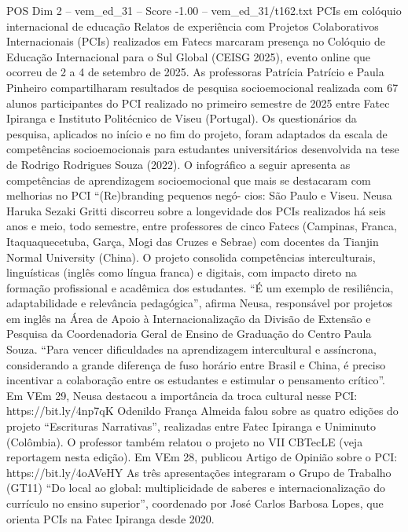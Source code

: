 \begin{textsample}{POS Dim 2 – vem\_ed\_31 – Score -1.00 – vem\_ed\_31/t162.txt}  \label{ex:f2_pos_064}
PCIs em colóquio internacional de educação Relatos de experiência com Projetos Colaborativos Internacionais (PCIs) realizados em Fatecs marcaram presença no Colóquio de Educação Internacional para o Sul Global (CEISG 2025), evento online que ocorreu de 2 a 4 de setembro de 2025.
As professoras Patrícia Patrício e Paula Pinheiro compartilharam resultados de pesquisa socioemocional realizada com 67 alunos participantes do PCI realizado no primeiro semestre de 2025 entre Fatec Ipiranga e Instituto Politécnico de Viseu (Portugal).
Os questionários da pesquisa, aplicados no início e no fim do projeto, foram adaptados da escala de competências socioemocionais para estudantes universitários desenvolvida na tese de Rodrigo Rodrigues Souza (2022).
O infográfico a seguir apresenta as competências de aprendizagem socioemocional que mais se destacaram com melhorias no PCI “(Re)branding pequenos negó- cios: São Paulo e Viseu.
Neusa Haruka Sezaki Gritti discorreu sobre a longevidade dos PCIs realizados há seis anos e meio, todo semestre, entre professores de cinco Fatecs (Campinas, Franca, Itaquaquecetuba, Garça, Mogi das Cruzes e Sebrae) com docentes da Tianjin Normal University (China).
O projeto consolida competências interculturais, linguísticas (inglês como língua franca) e digitais, com impacto direto na formação profissional e acadêmica dos estudantes. “É um exemplo de resiliência, adaptabilidade e relevância pedagógica”, afirma Neusa, responsável por projetos em inglês na Área de Apoio à Internacionalização da Divisão de Extensão e Pesquisa da Coordenadoria Geral de Ensino de Graduação do Centro Paula Souza. “Para vencer dificuldades na aprendizagem intercultural e assíncrona, considerando a grande diferença de fuso horário entre Brasil e China, é preciso incentivar a colaboração entre os estudantes e estimular o pensamento crítico”.
Em VEm 29, Neusa destacou a importância da troca cultural nesse PCI: https://bit.ly/4np7qK Odenildo França Almeida falou sobre as quatro edições do projeto “Escrituras Narrativas”, realizadas entre Fatec Ipiranga e Uniminuto (Colômbia).
O professor também relatou o projeto no VII CBTecLE (veja reportagem nesta edição).
Em VEm 28, publicou Artigo de Opinião sobre o PCI: https://bit.ly/4oAVeHY As três apresentações integraram o Grupo de Trabalho (GT11) “Do local ao global: multiplicidade de saberes e internacionalização do currículo no ensino superior”, coordenado por José Carlos Barbosa Lopes, que orienta PCIs na Fatec Ipiranga desde 2020.

\end{textsample}
